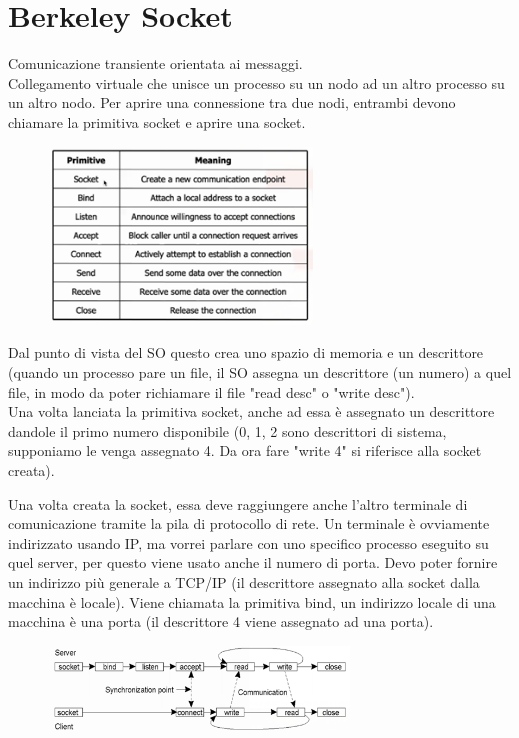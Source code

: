 \documentclass[12pt,italian]{report}
\begin{document}
\section{Berkeley Socket}
Comunicazione transiente orientata ai messaggi. \\
Collegamento virtuale che unisce un processo su un nodo ad un altro processo su un altro nodo. Per aprire una connessione tra due nodi, entrambi devono chiamare la primitiva socket e aprire una socket. 

\begin{figure}[h]
\centering
\includegraphics[width=70mm]{img/socket.png}
\end{figure}
Dal punto di vista del SO questo crea uno spazio di memoria e un descrittore (quando un processo pare un file, il SO assegna un descrittore (un numero) a quel file, in modo da poter richiamare il file "read desc" o "write desc"). \\ Una volta lanciata la primitiva socket, anche ad essa è assegnato un descrittore dandole il primo numero disponibile (0, 1, 2 sono descrittori di sistema, supponiamo le venga assegnato 4. Da ora fare "write 4" si riferisce alla socket creata). 

Una volta creata la socket, essa deve raggiungere anche l'altro terminale di comunicazione tramite la pila di protocollo di rete. Un terminale è ovviamente indirizzato usando IP, ma vorrei parlare con uno specifico processo eseguito su quel server, per questo viene usato anche il numero di porta. Devo poter fornire un indirizzo più generale a TCP/IP (il descrittore assegnato alla socket dalla macchina è locale). Viene chiamata la primitiva bind, un indirizzo locale di una macchina è una porta (il descrittore 4 viene assegnato ad una porta).

\begin{figure}[h]
\centering
\includegraphics[width=80mm]{img/fasi socket.png}
\end{figure}
\end{document}
